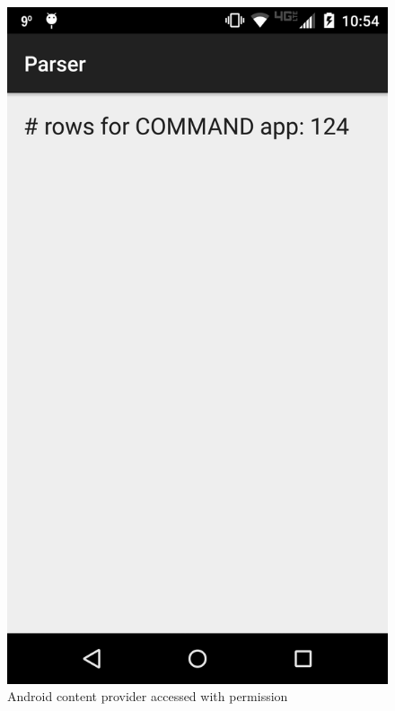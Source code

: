 \begin{figure}
\centering
\begin{minipage}{.45\columnwidth}
	\includegraphics[width=\columnwidth,scale=0.5]{images/bothHavePerm}
	\caption{Android content provider accessed with permission}
	\label{fig:bothHavePerm}
\end{minipage}
\hspace{.05\linewidth}
\begin{minipage}{.45\columnwidth}

\end{minipage}
\end{figure}
